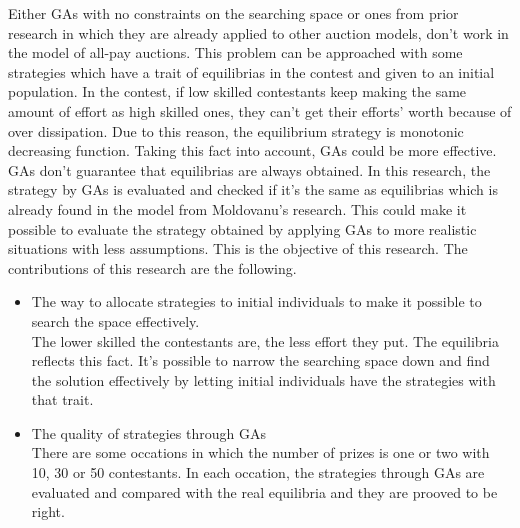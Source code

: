 \documentclass{kuisthesis}			%
\begin{document}
\begin{eabstract}
\begin{itemize}
\end{itemize}
Either GAs with no constraints on the searching space or ones from prior research in which they are already applied to other auction models, don't work  in the model of all-pay auctions. This problem can be approached with some strategies which have a trait of equilibrias in the contest and given to an initial population. In the contest, if low skilled contestants keep making the same amount of effort as high skilled ones, they can't get their efforts' worth because of over dissipation. Due to this reason, the equilibrium strategy is monotonic decreasing function. Taking this fact into account, GAs could be more effective.\\
GAs don't guarantee that equilibrias are always obtained. In this research, the strategy by GAs is evaluated and checked if it's the same as equilibrias which is already found in the model from Moldovanu's research. This could make it possible to evaluate the strategy obtained by applying GAs to more realistic situations with less assumptions. This is the objective of this research. The contributions of this research are the following.
\begin{itemize}
\item The way to allocate strategies to initial individuals to make it possible to search the space effectively.\\
The lower skilled the contestants are, the less effort they put. The equilibria reflects this fact. It's possible to narrow the searching space down and find the solution effectively by letting initial individuals have the strategies with that trait.
\item The quality of strategies through GAs\\ 
There are some occations in which the number of prizes is one or two with 10, 30 or 50 contestants. In each occation, the strategies through GAs are evaluated and compared with the real equilibria and they are prooved to be right.
\end{itemize}


\end{eabstract}
\end{document}
